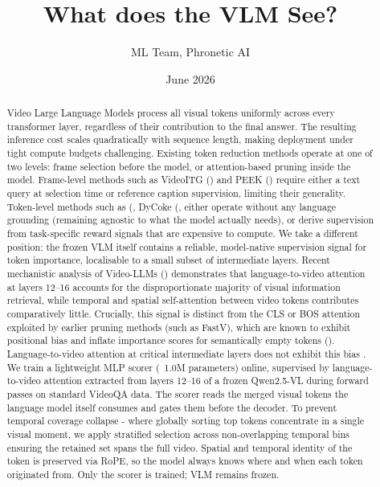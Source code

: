 \documentclass[12pt]{article}
\title{What does the VLM See?}
\author{ML Team, Phronetic AI}
\date{June 2026}
\begin{document}
\maketitle

\begin{abstract}
    Video Large Language Models process all visual tokens uniformly across every transformer layer, regardless of their contribution to the final answer. The resulting inference cost scales quadratically with sequence length, making deployment under tight compute budgets challenging. Existing token reduction methods operate at one of two levels: frame selection before the model, or attention-based pruning inside the model. Frame-level methods such as VideoITG (\cite{wang2026videoitgmultimodalvideounderstanding}) and PEEK (\cite{steunou2026peekpickingessentialframes}) require either a text query at selection time or reference caption supervision, limiting their generality. Token-level methods such as  (\cite{huang2026kitokekernelbasedintervalawaretoken}, DyCoke (\cite{tao2025dycokedynamiccompressiontokens}, either operate without any language grounding (remaining agnostic to what the model actually needs), or derive supervision from task-specific reward signals that are expensive to compute.
    We take a different position: the frozen VLM itself contains a reliable, model-native supervision signal for token importance, localisable to a small subset of intermediate layers. Recent mechanistic analysis of Video-LLMs (\cite{gou2025empiricalstudyvideollmsanswer}) demonstrates that language-to-video attention at layers 12–16 accounts for the disproportionate majority of visual information retrieval, while temporal and spatial self-attention between video tokens contributes comparatively little. Crucially, this signal is distinct from the CLS or BOS attention exploited by earlier pruning methods (such as FastV), which are known to exhibit positional bias and inflate importance scores for semantically empty tokens (\cite{myrzakhan2026sinkawarepruningdiffusionlanguage}). Language-to-video attention at critical intermediate layers does not exhibit this bias \cite{takezoe2026learnprunerrethinkingattentionbasedtoken}.
    We train a lightweight MLP scorer (~1.0M parameters) online, supervised by language-to-video attention extracted from layers 12–16 of a frozen Qwen2.5-VL during forward passes on standard VideoQA data. The scorer reads the merged visual tokens the language model itself consumes and gates them before the decoder. To prevent temporal coverage collapse - where globally sorting top tokens concentrate in a single visual moment, we apply stratified selection across non-overlapping temporal bins ensuring the retained set spans the full video. Spatial and temporal identity of the token is preserved via RoPE, so the model always knows where and when each token originated from. Only the scorer is trained; VLM remains frozen.


\end{abstract}
\end{document}
